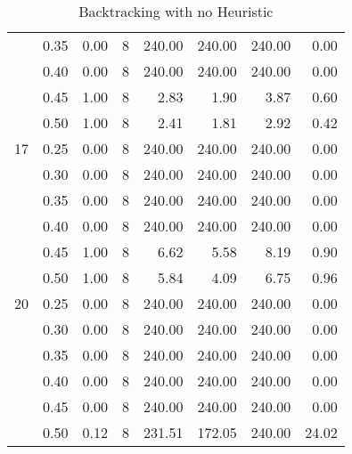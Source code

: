 \documentclass[11pt]{article}
\begin{document}
\begin{table}
\begin{tabular}{llrrrrrr}
    & 0.35 &           0.00 &              8 & 240.00 & 240.00 & 240.00 &      0.00 \\
    & 0.40 &           0.00 &              8 & 240.00 & 240.00 & 240.00 &      0.00 \\
    & 0.45 &           1.00 &              8 &   2.83 &   1.90 &   3.87 &      0.60 \\
    & 0.50 &           1.00 &              8 &   2.41 &   1.81 &   2.92 &      0.42 \\
    \midrule
    17 & 0.25 &           0.00 &              8 & 240.00 & 240.00 & 240.00 &      0.00 \\
    & 0.30 &           0.00 &              8 & 240.00 & 240.00 & 240.00 &      0.00 \\
    & 0.35 &           0.00 &              8 & 240.00 & 240.00 & 240.00 &      0.00 \\
    & 0.40 &           0.00 &              8 & 240.00 & 240.00 & 240.00 &      0.00 \\
    & 0.45 &           1.00 &              8 &   6.62 &   5.58 &   8.19 &      0.90 \\
    & 0.50 &           1.00 &              8 &   5.84 &   4.09 &   6.75 &      0.96 \\
    \midrule
    20 & 0.25 &           0.00 &              8 & 240.00 & 240.00 & 240.00 &      0.00 \\
    & 0.30 &           0.00 &              8 & 240.00 & 240.00 & 240.00 &      0.00 \\
    & 0.35 &           0.00 &              8 & 240.00 & 240.00 & 240.00 &      0.00 \\
    & 0.40 &           0.00 &              8 & 240.00 & 240.00 & 240.00 &      0.00 \\
    & 0.45 &           0.00 &              8 & 240.00 & 240.00 & 240.00 &      0.00 \\
    & 0.50 &           0.12 &              8 & 231.51 & 172.05 & 240.00 &     24.02 \\
    \bottomrule
  \end{tabular}
  \caption{Backtracking with no Heuristic}\label{tab:BT}
\end{table}
\end{document}
